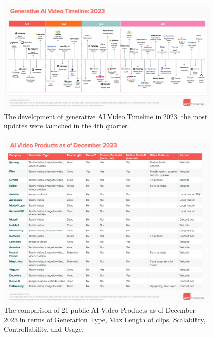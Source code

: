 \documentclass[11pt,a4paper,oneside]{report}
\begin{document}
\begin{figure}[htbp]
  \centering
  \includegraphics[width=\textwidth]{timeline.png}
  \caption{The development of generative AI Video Timeline in 2023, the most updates were launched in the 4th quarter. \cite{a16zAI2023}}
\end{figure}

\begin{figure}[htbp]
  \centering
  \includegraphics[width=\textwidth]{products.png}
  \caption{The comparison of 21 public AI Video Products as of December 2023 in terms of Generation Type, Max Length of clips, Scalability, Controllability, and Usage. \cite{a16zAI2023}}
\end{figure}
\end{document}
